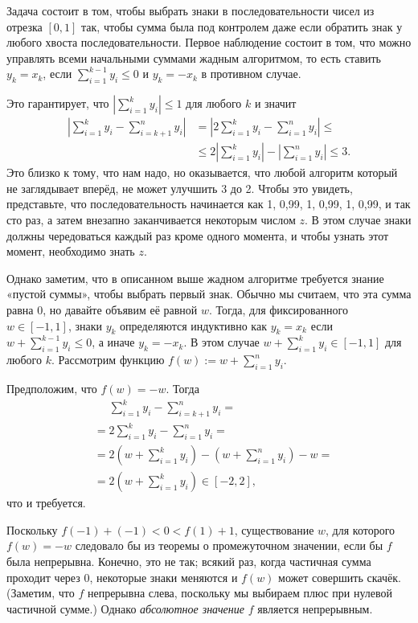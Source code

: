 Задача состоит в том, чтобы выбрать знаки в последовательности чисел из отрезка $[0,1]$ так, чтобы сумма была под контролем даже если обратить знак у любого хвоста последовательности.
Первое наблюдение состоит в том, что можно управлять всеми начальными суммами жадным алгоритмом, то есть ставить $y_k=x_k$, если $\sum_{i=1}^{k-1}y_i \le 0$ и $y_k=-x_k$ в противном случае.

Это гарантирует, что $\left|\sum_{i=1}^{k}y_i\right| \le 1$ для любого $k$ и значит
\begin{align*}
\left|\sum_{i=1}^{k}y_i-\sum_{i=k+1}^{n}y_i\right|&=\left|2\sum_{i=1}^{k}y_i-\sum_{i=1}^{n}y_i\right|\le
\\
&\le2\left|\sum_{i=1}^{k}y_i\right|-\left|\sum_{i=1}^{n}y_i\right|\le3.
\end{align*}
Это близко к тому, что нам надо, но оказывается, что любой алгоритм который не заглядывает вперёд, не может улучшить 3 до 2.
Чтобы это увидеть, представьте, что последовательность начинается как
1, 0,99, 1, 0,99, 1, 0,99, и так сто раз, а затем внезапно заканчивается некоторым числом $z$.
В этом случае знаки должны чередоваться каждый раз кроме одного момента, и чтобы узнать этот момент, необходимо знать $z$.

Однако заметим, что в описанном выше жадном алгоритме требуется знание «пустой суммы», чтобы выбрать первый знак.
Обычно мы считаем, что эта сумма равна 0, но давайте объявим её равной $w$.
Тогда, для фиксированного $w\in [-1,1]$, знаки $y_k$ определяются индуктивно как $y_k=x_k$ если $w+\sum_{i=1}^{k-1}y_i \le 0$, а иначе $y_k=-x_k$.
В этом случае $w+\sum_{i=1}^{k}y_i \in[-1,1]$ для любого $k$.
Рассмотрим функцию $f(w) \mathop{{:}{=}} w+\sum_{i=1}^ny_i$. %

Предположим, что $f(w)=-w$.
Тогда
\begin{align*}
&\phantom{=}\sum_{i=1}^{k}y_i-\sum_{i=k+1}^{n}y_i=
\\
&=2\sum_{i=1}^{k}y_i-\sum_{i=1}^{n}y_i=
\\
&=2\left(w+\sum_{i=1}^{k}y_i\right)-\left(w+\sum_{i=1}^{n}y_i\right)-w=
\\
&=2\left(w+\sum_{i=1}^{k}y_i\right)\in[-2,2],
\end{align*}
что и требуется.

Поскольку  $f(-1)+(-1)<0 <f(1)+ 1$, существование $w$, для которого $f(w)=-w$ следовало бы из теоремы о промежуточном значении, если бы $f$ была непрерывна.
Конечно, это не так; всякий раз, когда частичная сумма проходит через 0, некоторые знаки меняются и $f(w)$ может совершить скачёк.
(Заметим, что $f$ непрерывна слева, поскольку мы выбираем плюс при нулевой частичной сумме.)
Однако \emph{абсолютное значение} $f$ является непрерывным.

